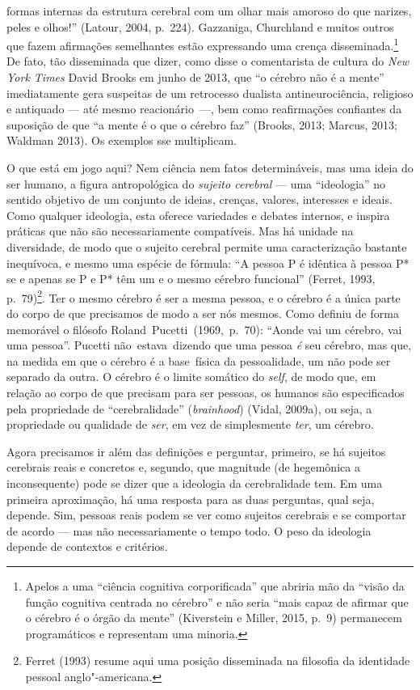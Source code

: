 formas internas da estrutura cerebral com um olhar mais amoroso do que
narizes, peles e olhos!'' (Latour, 2004, p.~224). Gazzaniga, Churchland e
muitos outros que fazem afirmações semelhantes estão expressando uma
crença disseminada.\footnote[2]{Apelos a uma ``ciência cognitiva corporificada'' que abriria mão da
``visão da função cognitiva centrada no cérebro'' e não seria ``mais
capaz de afirmar que o cérebro é o órgão da mente'' (Kiverstein e
Miller, 2015, p.~9) permanecem programáticos e representam uma minoria.} De fato, tão disseminada que
dizer, como disse o comentarista de cultura do \emph{New York Times}
David Brooks em junho de 2013, que ``o cérebro não é a mente''
imediatamente gera suspeitas de um retrocesso dualista
antineurociência, religioso e antiquado --- até mesmo reacionário~---,
bem como reafirmações confiantes da suposição de que ``a mente é o que o
cérebro faz'' (Brooks, 2013; Marcus, 2013; Waldman 2013). Os exemplos
sse multiplicam.

O que está em jogo aqui? Nem ciência nem fatos determináveis, mas uma
ideia do ser humano, a figura antropológica do \emph{sujeito cerebral}
--- uma ``ideologia'' no sentido objetivo de um conjunto de ideias,
crenças, valores, interesses e ideais. Como qualquer ideologia, esta
oferece variedades e debates internos, e inspira práticas que não são
necessariamente compatíveis. Mas há unidade na diversidade, de modo que
o sujeito cerebral permite uma caracterização bastante inequívoca, e
mesmo uma espécie de fórmula: ``A pessoa P é idêntica à pessoa P* se e
apenas se P e P* têm um e o mesmo cérebro funcional'' (Ferret, 1993,
p.~79)\footnote[3]{Ferret (1993) resume aqui uma posição disseminada na filosofia da
identidade pessoal anglo"-americana.}. Ter o mesmo cérebro é ser a mesma pessoa, e o
cérebro é a única parte do corpo de que precisamos de modo a ser nós
mesmos. Como definiu de forma memorável o filósofo Roland~Pucetti~(1969,~p.~70): ``Aonde vai um cérebro, vai uma pessoa''. Pucetti não~estava~dizendo
que uma pessoa \emph{é} seu cérebro, mas que, na medida em que o
cérebro é a base~física da pessoalidade, um não pode ser separado da
outra. O cérebro é o limite somático do \emph{self}, de modo que, em relação ao
corpo de que precisam para ser pessoas, os humanos são especificados
pela propriedade de ``cerebralidade'' (\emph{brainhood}) (Vidal, 2009a),
ou seja, a propriedade ou qualidade de \emph{ser}, em vez de
simplesmente \emph{ter}, um cérebro.

Agora precisamos ir além das definições e perguntar, primeiro, se há
sujeitos cerebrais reais e concretos e, segundo, que magnitude (de
hegemônica a inconsequente) pode se dizer que a ideologia da
cerebralidade tem. Em uma primeira aproximação, há uma resposta para as
duas perguntas, qual seja, depende. Sim, pessoas reais podem se ver como
sujeitos cerebrais e se comportar de acordo --- mas não necessariamente
o tempo todo. O peso da ideologia depende de contextos e critérios.

